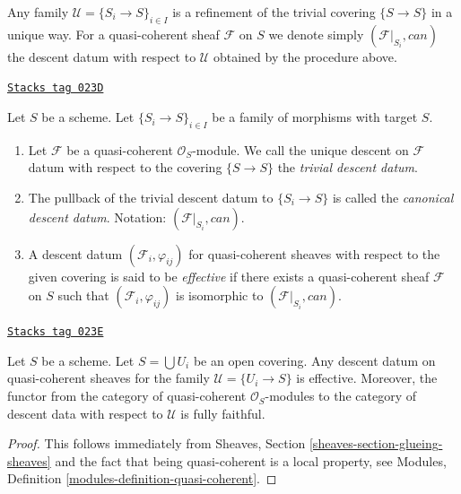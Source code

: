 Any family $\mathcal{U} = \{S_i \to S\}_{i \in I}$ is a refinement of
the trivial covering $\{S \to S\}$ in a unique way. For
a quasi-coherent sheaf $\mathcal{F}$ on $S$ we denote simply
$(\mathcal{F}|_{S_i}, can)$ the descent datum with respect to
$\mathcal{U}$ obtained by the procedure above.

\begin{definition}
\label{descent-definition-descent-datum-effective-quasi-coherent}
\href{https://stacks.math.columbia.edu/tag/023D}{\texttt{Stacks tag 023D}}

Let $S$ be a scheme.
Let $\{S_i \to S\}_{i \in I}$ be a family of morphisms
with target $S$.
\begin{enumerate}
\item Let $\mathcal{F}$ be a quasi-coherent $\mathcal{O}_S$-module.
We call the unique descent on $\mathcal{F}$ datum with respect to the covering
$\{S \to S\}$ the {\it trivial descent datum}.
\item The pullback of the trivial descent datum to
$\{S_i \to S\}$ is called the {\it canonical descent datum}.
Notation: $(\mathcal{F}|_{S_i}, can)$.
\item A descent datum $(\mathcal{F}_i, \varphi_{ij})$
for quasi-coherent sheaves with respect to the given covering
is said to be {\it effective} if there exists a quasi-coherent
sheaf $\mathcal{F}$ on $S$ such that $(\mathcal{F}_i, \varphi_{ij})$
is isomorphic to $(\mathcal{F}|_{S_i}, can)$.
\end{enumerate}
\end{definition}

\begin{lemma}
\label{descent-lemma-zariski-descent-effective}
\href{https://stacks.math.columbia.edu/tag/023E}{\texttt{Stacks tag 023E}}

Let $S$ be a scheme.
Let $S = \bigcup U_i$ be an open covering.
Any descent datum on quasi-coherent sheaves
for the family $\mathcal{U} = \{U_i \to S\}$ is
effective. Moreover, the functor from the category of
quasi-coherent $\mathcal{O}_S$-modules to the category
of descent data with respect to $\mathcal{U}$ is fully faithful.
\end{lemma}

\begin{proof}
This follows immediately from
Sheaves, Section \ref{sheaves-section-glueing-sheaves}
and the fact that being quasi-coherent is a local property, see
Modules, Definition \ref{modules-definition-quasi-coherent}.
\end{proof}

